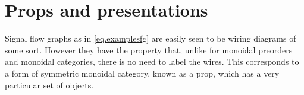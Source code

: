\documentclass[7Sketches]{subfiles}
\begin{document}




%
%


\section{Props and presentations}%
\label{sec.props_and_presentations}

Signal flow graphs as in \cref{eq.examplesfg} are easily seen to be wiring
diagrams of some sort. However they have the property that, unlike for monoidal
preorders and monoidal categories, there is no need to label the wires. This
corresponds to a form of symmetric monoidal category, known as a prop, which has
a very particular set of objects.
\end{document}
